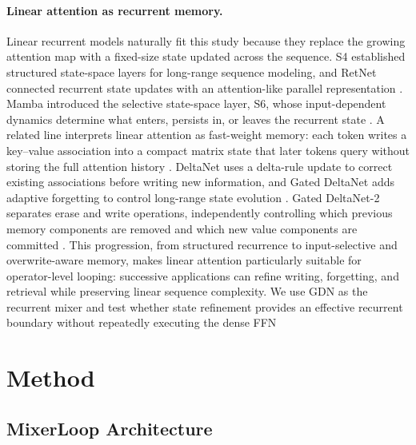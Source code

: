 \documentclass[letterpaper]{article} %
\begin{document}
\paragraph{Linear attention as recurrent memory.}
Linear recurrent models naturally fit this study because they replace the
growing attention map with a fixed-size state updated across the sequence. S4
established structured state-space layers for long-range sequence modeling, and
RetNet connected recurrent state updates with an attention-like parallel
representation \cite{gu2022efficientlymodelinglong,sun2023retentivenetworksuccessor}.
Mamba introduced the selective state-space layer, S6, whose input-dependent
dynamics determine what enters, persists in, or leaves the recurrent state
\cite{gu2024mambalineartimesequence}. A related line interprets linear
attention as fast-weight memory: each token writes a key--value association into
a compact matrix state that later tokens query without storing the full
attention history \cite{schlag2021lineartransformerssecretlyfast}. DeltaNet
uses a delta-rule update to correct existing associations before writing new
information, and Gated DeltaNet adds adaptive forgetting to control long-range
state evolution \cite{yang2025gateddeltanetworksimproving}. Gated DeltaNet-2
separates erase and write operations, independently controlling which previous
memory components are removed and which new value components are committed
\cite{hatamizadeh2026gateddeltanet2}. This progression, from structured
recurrence to input-selective and overwrite-aware memory, makes linear
attention particularly suitable for operator-level looping: successive
applications can refine writing, forgetting, and retrieval while preserving
linear sequence complexity. We use GDN as the recurrent mixer and test whether state refinement provides an effective recurrent boundary without repeatedly executing the dense FFN


\section{Method}

\subsection{MixerLoop Architecture}
\end{document}
